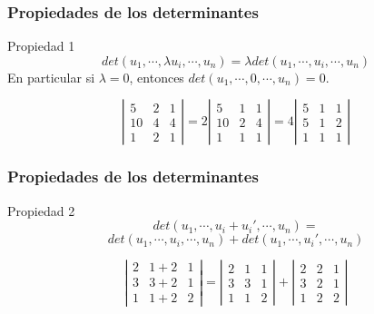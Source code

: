 \documentclass[12pt]{article}
\begin{document}
  
             \begin{frame}
  \frametitle{Propiedades de los determinantes}
   \begin{block}{Propiedad 1}
   \[det(u_1, \cdots,\lambda u_i, \cdots , u_n) = \lambda det(u_1,\cdots, u_i, \cdots, u_n) \]
   En particular si $\lambda=0$, entonces $det(u_1,\cdots,0,\cdots,u_n) = 0$.
\end{block}

\[ \left|\begin{array}{ccc}5 & 2 & 1 \\10 & 4 & 4 \\1 & 2 & 1\end{array}\right|
=  2\left|\begin{array}{ccc}5 & 1 & 1 \\10 & 2 & 4 \\1 & 1 & 1\end{array}\right|
=  4\left|\begin{array}{ccc}5 & 1 & 1 \\5 & 1 & 2 \\1 & 1 & 1\end{array}\right|
\]
  \end{frame} 
  
  
  
             \begin{frame}
  \frametitle{Propiedades de los determinantes}
   \begin{block}{Propiedad 2}
   \[det(u_1, \cdots,u_i+u_i', \cdots , u_n) =\] \[ det(u_1,\cdots, u_i, \cdots, u_n) + det(u_1,\cdots, u_i', \cdots, u_n) \]
\end{block}

\[ \left|\begin{array}{ccc}2 & 1+2 & 1 \\3 & 3+2 & 1 \\1 & 1+2 & 2\end{array}\right|
= \left|\begin{array}{ccc}2 & 1 & 1 \\3 & 3 & 1 \\1 & 1 & 2\end{array}\right|
+ \left|\begin{array}{ccc}2 & 2 & 1 \\3 & 2 & 1 \\1 & 2 & 2\end{array}\right|
\]
  \end{frame} 
  
\end{document}
